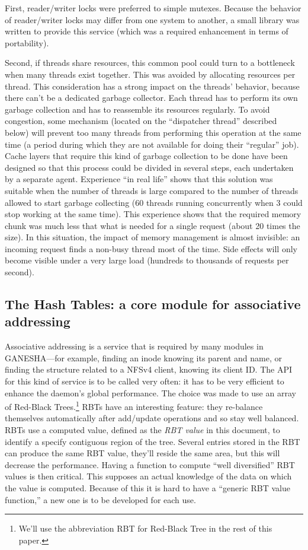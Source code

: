 \documentclass[final]{ols}
\begin{document}
First, reader/writer locks were preferred to simple mutexes. Because
the behavior of reader/\linebreak[0]writer locks may differ from one system to
another, a small library was written to provide this service (which
was a required enhancement in terms of portability).

Second, if threads share resources, this common pool could turn to a
bottleneck when many threads exist together. This was avoided by
allocating resources per thread. This consideration has a strong
impact on the threads' behavior, because there can't be a dedicated garbage
collector. Each thread has to perform its own garbage collection and
has to reassemble its resources regularly. To avoid congestion, some
mechanism (located on the ``dispatcher thread'' described below) will
prevent too many threads from performing this operation at the same time (a
period during which they are not available for doing their ``regular''
job).  Cache layers that require this kind of garbage collection to be
done have been designed so that this process could be divided in
several steps, each undertaken by a separate agent.  Experience ``in
real life'' shows that this solution was suitable when the number of
threads is large compared to the number of threads allowed to start
garbage collecting (60 threads running concurrently when 3 could stop
working at the same time). This experience shows that the required
memory chunk was much less that what is needed for a single request
(about 20 times the size). In this situation, the impact of memory
management is almost invisible: an incoming request finds a non-busy
thread most of the time. Side effects will only become visible under
a very large load (hundreds to thousands of requests per second).

\subsection{The Hash Tables: a core module for associative addressing}

Associative addressing is a service that is required by many modules
in GANESHA---for example, finding an inode knowing its parent and name,
or finding the structure related to a NFSv4 client, knowing its client
ID.  The API for this kind of service is to be called very often: it
has to be very efficient to enhance the daemon's global performance.
The choice was made to use an array of Red-Black Trees.\footnote{We'll use
the abbreviation RBT for Red-Black Tree in the rest of this
paper.}  RBTs have an interesting feature: they re-balance
themselves automatically after add/update operations and so stay well
balanced. RBTs use a computed value, defined as the \textit{RBT value} in
this document, to identify a specify contiguous region of the tree.
Several entries stored in the RBT can produce the same RBT value,
they'll reside the same area, but this will decrease the performance.
Having a function to compute ``well diversified'' RBT values is then
critical. This supposes an actual knowledge of the data on which the
value is computed. Because of this it is hard to have a ``generic RBT
value function,'' a new one is to be developed for each use.
\end{document}
